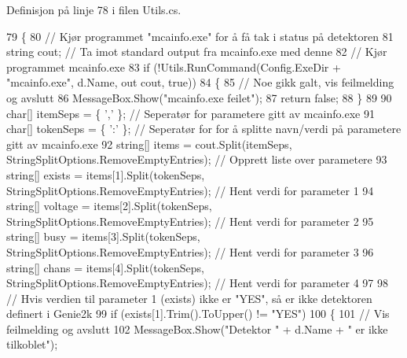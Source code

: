 Definisjon på linje 78 i filen Utils.\+cs.


\begin{DoxyCode}
79         \{
80             \textcolor{comment}{// Kjør programmet "mcainfo.exe" for å få tak i status på detektoren}
81             \textcolor{keywordtype}{string} cout; \textcolor{comment}{// Ta imot standard output fra mcainfo.exe med denne}
82             \textcolor{comment}{// Kjør programmet mcainfo.exe}
83             \textcolor{keywordflow}{if} (!Utils.RunCommand(Config.ExeDir + \textcolor{stringliteral}{"mcainfo.exe"}, d.Name, out cout, \textcolor{keyword}{true}))
84             \{
85                 \textcolor{comment}{// Noe gikk galt, vis feilmelding og avslutt}
86                 MessageBox.Show(\textcolor{stringliteral}{"mcainfo.exe feilet"});
87                 \textcolor{keywordflow}{return} \textcolor{keyword}{false};
88             \}
89 
90             \textcolor{keywordtype}{char}[] itemSeps = \{ \textcolor{charliteral}{','} \}; \textcolor{comment}{// Seperatør for parametere gitt av mcainfo.exe}
91             \textcolor{keywordtype}{char}[] tokenSeps = \{ \textcolor{charliteral}{':'} \}; \textcolor{comment}{// Seperatør for for å splitte navn/verdi på parametere gitt av
       mcainfo.exe}
92             \textcolor{keywordtype}{string}[] items = cout.Split(itemSeps, StringSplitOptions.RemoveEmptyEntries); \textcolor{comment}{// Opprett liste
       over parametere}
93             \textcolor{keywordtype}{string}[] exists = items[1].Split(tokenSeps, StringSplitOptions.RemoveEmptyEntries); \textcolor{comment}{// Hent
       verdi for parameter 1}
94             \textcolor{keywordtype}{string}[] voltage = items[2].Split(tokenSeps, StringSplitOptions.RemoveEmptyEntries); \textcolor{comment}{// Hent
       verdi for parameter 2}
95             \textcolor{keywordtype}{string}[] busy = items[3].Split(tokenSeps, StringSplitOptions.RemoveEmptyEntries); \textcolor{comment}{// Hent verdi
       for parameter 3}
96             \textcolor{keywordtype}{string}[] chans = items[4].Split(tokenSeps, StringSplitOptions.RemoveEmptyEntries); \textcolor{comment}{// Hent
       verdi for parameter 4}
97 
98             \textcolor{comment}{// Hvis verdien til parameter 1 (exists) ikke er "YES", så er ikke detektoren definert i
       Genie2k}
99             \textcolor{keywordflow}{if} (exists[1].Trim().ToUpper() != \textcolor{stringliteral}{"YES"})
100             \{
101                 \textcolor{comment}{// Vis feilmelding og avslutt}
102                 MessageBox.Show(\textcolor{stringliteral}{"Detektor "} + d.Name + \textcolor{stringliteral}{" er ikke tilkoblet"});

\end{DoxyCode}
